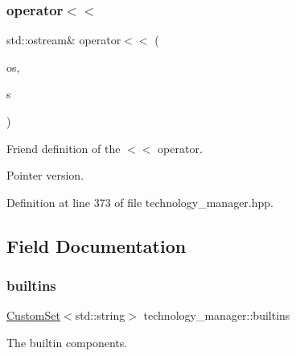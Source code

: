 \mbox{\label{classtechnology__manager_a15b9b3e0d9c8aeef181027d6cbfee9ef}} 
\subsubsection{\texorpdfstring{operator$<$$<$}{operator<<}\hspace{0.1cm}{\footnotesize\ttfamily [2/2]}}
{\footnotesize\ttfamily std\+::ostream\& operator$<$$<$ (\begin{DoxyParamCaption}\item[{std\+::ostream \&}]{os,  }\item[{const \hyperlink{technology__manager_8hpp_a4b9ecd440c804109c962654f9227244e}{technology\+\_\+manager\+Ref} \&}]{s }\end{DoxyParamCaption})\hspace{0.3cm}{\ttfamily [friend]}}



Friend definition of the $<$$<$ operator. 

Pointer version. 

Definition at line 373 of file technology\+\_\+manager.\+hpp.



\subsection{Field Documentation}
\mbox{\label{classtechnology__manager_a8cfeed1c0e67d56143d76cd67c482fcf}} 
\subsubsection{\texorpdfstring{builtins}{builtins}}
{\footnotesize\ttfamily \hyperlink{custom__set_8hpp_a615bc2f42fc38a4bb1790d12c759e86f}{Custom\+Set}$<$std\+::string$>$ technology\+\_\+manager\+::builtins\hspace{0.3cm}{\ttfamily [private]}}



The builtin components. 



